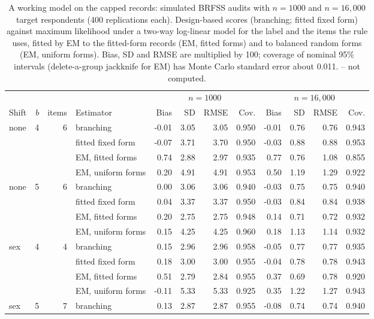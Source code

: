 \begin{table}[h]
\centering
\caption{A working model on the capped records: simulated BRFSS audits with $n=1000$ and $n=16,000$ target respondents (400 replications each). Design-based scores (branching; fitted fixed form) against maximum likelihood under a two-way log-linear model for the label and the items the rule uses, fitted by EM to the fitted-form records (EM, fitted forms) and to balanced random forms (EM, uniform forms). Bias, SD and RMSE are multiplied by 100; coverage of nominal 95\% intervals (delete-a-group jackknife for EM) has Monte Carlo standard error about 0.011. -- not computed.}
\label{tab:em}
\scriptsize
\setlength{\tabcolsep}{2.8pt}
\begin{tabular}{lrrlrrrrrrrr}
\toprule
 & & & & \multicolumn{4}{c}{$n=1000$} & \multicolumn{4}{c}{$n=16,000$} \\
Shift & $b$ & items & Estimator & Bias & SD & RMSE & Cov. & Bias & SD & RMSE & Cov. \\
\midrule
none & 4 & 6 & branching & -0.01 & 3.05 & 3.05 & 0.950 & -0.01 & 0.76 & 0.76 & 0.943 \\
 &  &  & fitted fixed form & -0.07 & 3.71 & 3.70 & 0.950 & -0.03 & 0.88 & 0.88 & 0.953 \\
 &  &  & EM, fitted forms & 0.74 & 2.88 & 2.97 & 0.935 & 0.77 & 0.76 & 1.08 & 0.855 \\
 &  &  & EM, uniform forms & 0.20 & 4.91 & 4.91 & 0.953 & 0.50 & 1.19 & 1.29 & 0.922 \\
none & 5 & 6 & branching & 0.00 & 3.06 & 3.06 & 0.940 & -0.03 & 0.75 & 0.75 & 0.940 \\
 &  &  & fitted fixed form & 0.04 & 3.37 & 3.37 & 0.950 & -0.03 & 0.84 & 0.84 & 0.938 \\
 &  &  & EM, fitted forms & 0.20 & 2.75 & 2.75 & 0.948 & 0.14 & 0.71 & 0.72 & 0.932 \\
 &  &  & EM, uniform forms & 0.15 & 4.25 & 4.25 & 0.960 & 0.18 & 1.13 & 1.14 & 0.932 \\
sex & 4 & 4 & branching & 0.15 & 2.96 & 2.96 & 0.958 & -0.05 & 0.77 & 0.77 & 0.935 \\
 &  &  & fitted fixed form & 0.18 & 3.00 & 3.00 & 0.955 & -0.04 & 0.78 & 0.78 & 0.943 \\
 &  &  & EM, fitted forms & 0.51 & 2.79 & 2.84 & 0.955 & 0.37 & 0.69 & 0.78 & 0.920 \\
 &  &  & EM, uniform forms & -0.11 & 5.33 & 5.33 & 0.925 & 0.35 & 1.22 & 1.27 & 0.943 \\
sex & 5 & 7 & branching & 0.13 & 2.87 & 2.87 & 0.955 & -0.08 & 0.74 & 0.74 & 0.940 \\

\end{tabular}
\end{table}

